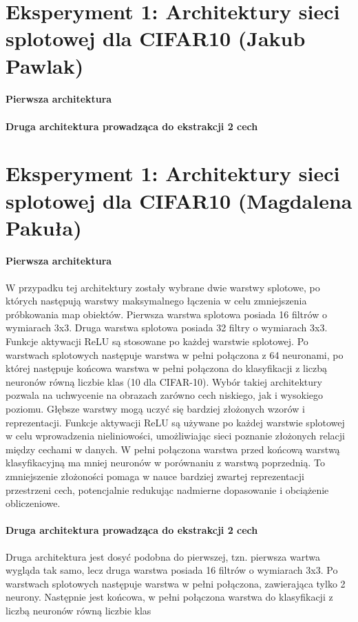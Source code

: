 \documentclass[10pt]{article}
\begin{document}
\pagebreak
\section{Eksperyment 1: Architektury sieci splotowej dla CIFAR10 (Jakub Pawlak)}\label{sec:ex1-pawlak_cifar}

\paragraph{Pierwsza architektura}
\paragraph{Druga architektura prowadząca do ekstrakcji 2 cech}

\pagebreak
\section{Eksperyment 1: Architektury sieci splotowej dla CIFAR10 (Magdalena Pakuła)}\label{sec:ex1-pakula_cifar}

\paragraph{Pierwsza architektura}
W przypadku tej architektury zostały wybrane dwie warstwy splotowe, po których następują warstwy maksymalnego łączenia w celu zmniejszenia próbkowania map obiektów.
Pierwsza warstwa splotowa posiada 16 filtrów o wymiarach 3x3.
Druga warstwa splotowa posiada 32 filtry o wymiarach 3x3.
Funkcje aktywacji ReLU są stosowane po każdej warstwie splotowej.
Po warstwach splotowych następuje warstwa w pełni połączona z 64 neuronami, po której następuje końcowa warstwa w pełni połączona do klasyfikacji z liczbą neuronów równą liczbie klas (10 dla CIFAR-10).
Wybór takiej architektury pozwala na uchwycenie na obrazach zarówno cech niskiego, jak i wysokiego poziomu. Głębsze warstwy mogą uczyć się bardziej złożonych wzorów i reprezentacji.
Funkcje aktywacji ReLU są używane po każdej warstwie splotowej w celu wprowadzenia nieliniowości, umożliwiając sieci poznanie złożonych relacji między cechami w danych.
W pełni połączona warstwa przed końcową warstwą klasyfikacyjną ma mniej neuronów w porównaniu z warstwą poprzednią. To zmniejszenie złożoności pomaga w nauce bardziej zwartej reprezentacji przestrzeni cech, potencjalnie redukując nadmierne dopasowanie i obciążenie obliczeniowe.

\paragraph{Druga architektura prowadząca do ekstrakcji 2 cech}
Druga architektura jest dosyć podobna do pierwszej, tzn. pierwsza wartwa wygląda tak samo, lecz druga warstwa posiada 16 filtrów o wymiarach 3x3.
Po warstwach splotowych następuje warstwa w pełni połączona, zawierająca tylko 2 neurony. Następnie jest końcowa, w pełni połączona warstwa do klasyfikacji z liczbą neuronów równą liczbie klas
\end{document}
